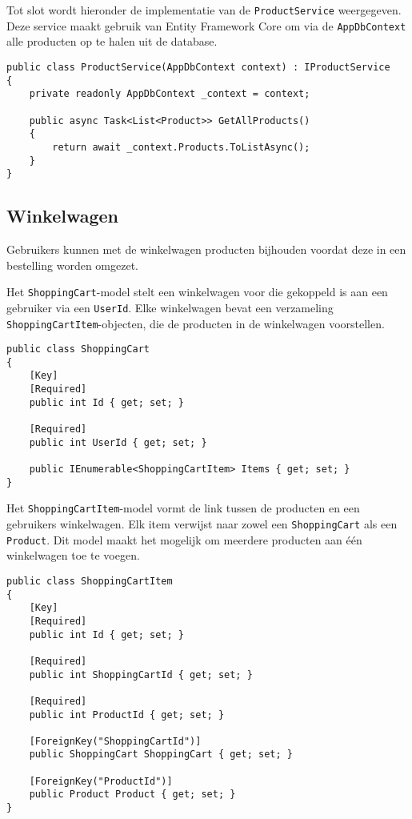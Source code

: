 \medskip
Tot slot wordt hieronder de implementatie van de \texttt{ProductService} weergegeven. Deze service maakt gebruik van Entity Framework Core om via de \texttt{AppDbContext} alle producten op te halen uit de database.
\medskip

\begin{lstlisting}[style=mystyleA, caption=ProductService.cs (fragment), label=lst:MonoProductService]
public class ProductService(AppDbContext context) : IProductService
{
	private readonly AppDbContext _context = context;
	
	public async Task<List<Product>> GetAllProducts()
	{
		return await _context.Products.ToListAsync();
	}
}
\end{lstlisting}

\subsection{Winkelwagen}

Gebruikers kunnen met de winkelwagen producten bijhouden voordat deze in een bestelling worden omgezet.

\medskip
Het \texttt{ShoppingCart}-model stelt een winkelwagen voor die gekoppeld is aan een gebruiker via een \texttt{UserId}. Elke winkelwagen bevat een verzameling \texttt{ShoppingCartItem}-objecten, die de producten in de winkelwagen voorstellen.
\medskip

\begin{lstlisting}[style=mystyleA, caption=ShoppingCart.cs, label=lst:MonoShoppingCartModel]
public class ShoppingCart
{
	[Key]
	[Required]
	public int Id { get; set; }
	
	[Required]
	public int UserId { get; set; }
	
	public IEnumerable<ShoppingCartItem> Items { get; set; }
}
\end{lstlisting}

\medskip
Het \texttt{ShoppingCartItem}-model vormt de link tussen de producten en een gebruikers winkelwagen. Elk item verwijst naar zowel een \texttt{ShoppingCart} als een \texttt{Product}. Dit model maakt het mogelijk om meerdere producten aan één winkelwagen toe te voegen.
\medskip

\begin{lstlisting}[style=mystyleA, caption=ShoppingCartItem.cs, label=lst:MonoShoppingCartItemModel]
public class ShoppingCartItem
{
	[Key]
	[Required]
	public int Id { get; set; }
	
	[Required]
	public int ShoppingCartId { get; set; }
	
	[Required]
	public int ProductId { get; set; }
	
	[ForeignKey("ShoppingCartId")]
	public ShoppingCart ShoppingCart { get; set; }
	
	[ForeignKey("ProductId")]
	public Product Product { get; set; }
}
\end{lstlisting}

